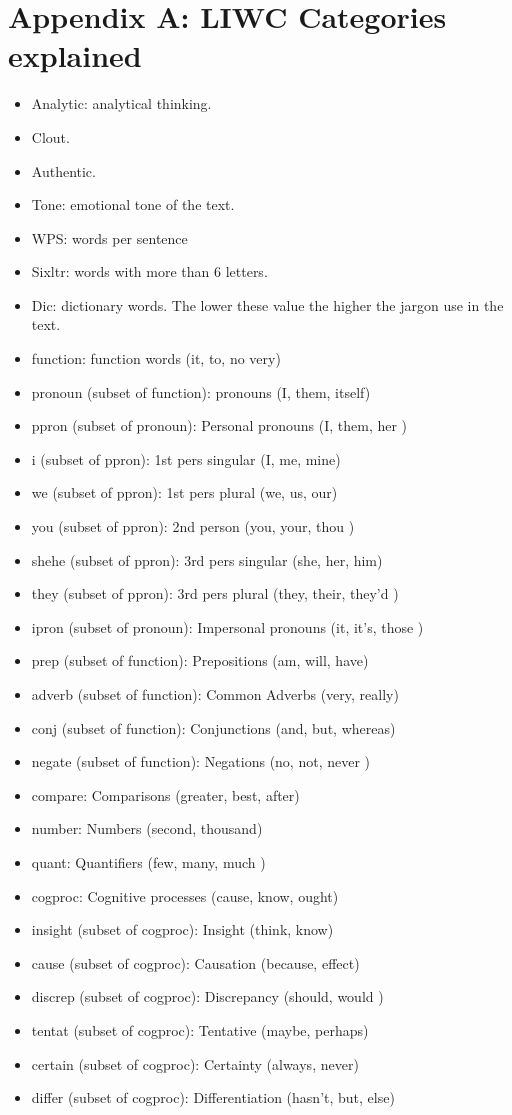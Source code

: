 \documentclass[12pt]{article}
\begin{document}
\section*{Appendix A: LIWC Categories explained}
\label{appa}
\begin{itemize}
  \item Analytic: analytical thinking.
  \item Clout.
  \item Authentic. 
  \item Tone: emotional tone of the text. 
  \item WPS: words per sentence
  \item Sixltr: words with more than 6 letters. 
  \item Dic: dictionary words. The lower these value the higher the jargon use in the text. 
  \item function: function words (it, to, no very)
  \item pronoun (subset of function): pronouns (I, them, itself)
  \item ppron (subset of pronoun): Personal pronouns (I, them, her )
  \item i (subset of ppron): 1st pers singular (I, me, mine)
  \item we (subset of ppron): 1st pers plural (we, us, our)
  \item you (subset of ppron): 2nd person (you, your, thou )
  \item shehe (subset of ppron): 3rd pers singular (she, her, him)
  \item they (subset of ppron): 3rd pers plural (they, their, they’d )
  \item ipron (subset of pronoun): Impersonal pronouns (it, it’s, those )
  \item prep (subset of function): Prepositions (am, will, have)
  \item adverb (subset of function): Common Adverbs (very, really) 
  \item conj (subset of function): Conjunctions (and, but, whereas)
  \item negate (subset of function): Negations (no, not, never )
  \item compare: Comparisons (greater, best, after)
  \item number: Numbers (second, thousand)
  \item quant: Quantifiers (few, many, much )
  \item cogproc: Cognitive processes (cause, know, ought)
  \item insight (subset of cogproc): Insight (think, know)
  \item cause (subset of cogproc): Causation (because, effect)
  \item discrep (subset of cogproc): Discrepancy (should, would )
  \item tentat (subset of cogproc): Tentative (maybe, perhaps)
  \item certain (subset of cogproc): Certainty (always, never)
  \item differ (subset of cogproc): Differentiation (hasn’t, but, else)
\end{itemize}
\end{document}
